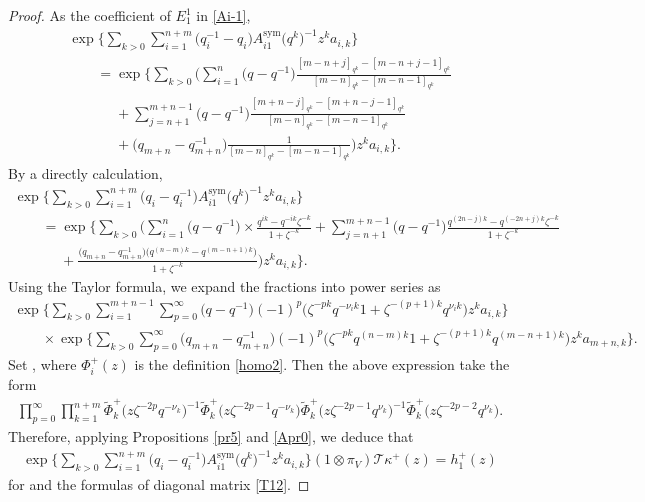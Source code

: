 \documentclass[pdftex]{sigma}
\numberwithin{equation}{section}
\begin{document}
\begin{proof}
As the coefficient of $E^1_1$ in \eqref{Ai-1},
\begin{gather*}
 \exp\Biggl\{\sum\limits_{k>0}\sum\limits_{i=1}^{n+m}\bigl(q_i^{-1}-q_i\bigr)
 A_{i1}^{\operatorname{sym}}\bigl(q^k\bigr)^{-1} z^k
 a_{i,k}\Biggr\}\\
 \qquad=\exp\Biggl\{\sum\limits_{k>0}\Biggl(\sum\limits_{i=1}^{n}\bigl(q-q^{-1}\bigr)
 \frac{[m-n+j]_{q^k}-[m-n+j-1]_{q^k}}{[m-n]_{q^k}-[m-n-1]_{q^k}}\\
 \phantom{\qquad=}{}+\sum\limits_{j=n+1}^{m+n-1}\bigl(q-q^{-1}\bigr)
 \frac{[m+n-j]_{q^k}-[m+n-j-1]_{q^k}}{[m-n]_{q^k}-[m-n-1]_{q^k}}\\
 \phantom{\qquad=}{} +\bigl(q_{m+n}-q_{m+n}^{-1}\bigr)\frac{1}{[m-n]_{q^k}-[m-n-1]_{q^k}}
 \biggr) z^k
 a_{i,k}\biggr\}.
\end{gather*}
By a directly calculation,
\begin{gather*}
 \exp\Biggl\{\sum\limits_{k>0}\sum\limits_{i=1}^{n+m}\bigl(q_i-q_i^{-1}\bigr)
 A_{i1}^{\operatorname{sym}}\bigl(q^k\bigr)^{-1} z^k
 a_{i,k}\Biggr\}\\
 \qquad=\exp\Biggl\{\sum\limits_{k>0}\Biggl(\sum\limits_{i=1}^{n}\bigl(q-q^{-1}\bigr)\times
 \frac{q^{ik}-q^{-ik}\zeta^{-k}}{1+\zeta^{-k}}+
 \sum\limits_{j=n+1}^{m+n-1}\bigl(q-q^{-1}\bigr)
 \frac{q^{(2n-j)k}-q^{(-2n+j)k}\zeta^{-k}}{1+\zeta^{-k}}\\
 \phantom{\qquad=}{} +
 \frac{\bigl(q_{m+n}-q_{m+n}^{-1}\bigr)\bigl(q^{(n-m)k}-q^{(m-n+1)k}\bigr)}{1+\zeta^{-k}}
 \biggr) z^k
 a_{i,k}\biggr\}.
\end{gather*}
Using the Taylor formula, we expand the fractions into power series as
\begin{gather*}
 \exp\Biggl\{\sum\limits_{k>0}\sum\limits_{i=1}^{m+n-1}\sum\limits_{p=0}^{\infty}\bigl(q-q^{-1}\bigr)(-1)^p
 \bigl(\zeta^{-pk}q^{-\nu_ik}1+\zeta^{-(p+1)k}q^{\nu_ik}\bigr)z^k
 a_{i,k}\Biggr\}\\
 \qquad \times\exp\Biggl\{\sum\limits_{k>0}\sum\limits_{p=0}^{\infty}\bigl(q_{m+n}-q_{m+n}^{-1}\bigr)(-1)^p
 \bigl(\zeta^{-pk}q^{(n-m)k}1+\zeta^{-(p+1)k}q^{(m-n+1)k}\bigr)z^k
 a_{m+n,k}\Biggr\}.
\end{gather*}
 Set , where $\Phi^+_i(z)$ is the definition \eqref{homo2}. Then the above expression take the form
\begin{gather*}
 \prod\limits_{p=0}^{\infty}\prod\limits_{k=1}^{n+m}\widetilde{\Phi}^{+}_{k}\bigl(z\zeta^{-2p} q^{-\nu_k}\bigr)^{-1}\widetilde{\Phi}^{+}_{k}\bigl(z\zeta^{-2p-1} q^{-\nu_k}\bigr)\widetilde{\Phi}^{+}_{k}\bigl(z\zeta^{-2p-1} q^{\nu_k}\bigr)^{-1}\widetilde{\Phi}^{+}_{k}\bigl(z\zeta^{-2p-2} q^{\nu_k}\bigr)
.
\end{gather*}
Therefore, applying Propositions \ref{pr5} and \ref{Apr0}, we deduce that
\begin{gather*}
 \exp\Biggl\{\sum\limits_{k>0}\sum\limits_{i=1}^{n+m}\bigl(q_i-q_i^{-1}\bigr)
 A_{i1}^{\operatorname{sym}}\bigl(q^k\bigr)^{-1} z^k
 a_{i,k}\Biggr\}(1\otimes\pi_V)\mathcal{T}\kappa^{+}(z)=h_1^{+}(z)
\end{gather*}
for  and
the formulas of diagonal matrix
\eqref{T12}.


\end{proof}
\end{document}
